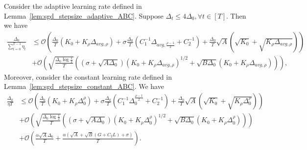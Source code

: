 \documentclass[10pt,a4paper]{amsart}
\newcommand{\Kr}{K_{\rho}}
\newcommand{\paren}[1]{\left( #1 \right)}
\begin{document}
\begin{lemma}\label{lem:sgd_stepsize_complexity_ABC}
    Consider the adaptive learning rate defined in Lemma~\ref{lem:sgd_stepsize_adaptive_ABC}. 
    Suppose $\Delta_t\leq 4\Delta_0,\forall t\in[T]$.
    Then  we have 
    \begin{align*}
        \frac{\Delta_0}{\sum_{t=0}^{T-1}\eta_t}&\leq
        \mathcal{O}\paren{\frac{\Delta_0}{T}\paren{K_0+\Kr\Delta_{avg,\rho}}+\sigma\frac{\Delta_0}{T}\paren{C_1^{-1}\Delta_{avg,\frac{\rho-1}{2}}+C_2^{-1}}
        +\frac{\Delta_0}{T}\sqrt{A}\paren{\sqrt{K_0}+\sqrt{\Kr\Delta_{avg,\rho}}}}\\
        &+\mathcal{O}\paren{\sqrt{\frac{\Delta_0\log\frac{1}{\delta}}{T}}\paren{ \paren{\sigma+\sqrt{A\Delta_0}}\paren{K_0+\Kr\Delta_{avg,\rho}}^{1/2}+\sqrt{B\Delta_0}\paren{K_0+\Kr\Delta_{avg,\rho}}}},
    \end{align*}
    Moreover, consider the constant learning rate defined in Lemma~\ref{lem:sgd_stepsize_constant_ABC}. We have 
    \begin{align*}
        \frac{\Delta_0}{\eta T}&\leq
        \mathcal{O}\paren{\frac{\Delta_0}{T}\paren{K_0+\Kr\Delta_{0}^{\rho}}+\sigma\frac{\Delta_0}{T}\paren{C_1^{-1}\Delta_{0}^{\frac{\rho-1}{2}}+C_2^{-1}}
        +\frac{\Delta_0}{T}\sqrt{A}\paren{\sqrt{K_0}+\sqrt{\Kr\Delta_{0}^{\rho}}}}\\
        &+\mathcal{O}\paren{\sqrt{\frac{\Delta_0\log\frac{1}{\delta}}{T}}\paren{ \paren{\sigma+\sqrt{A\Delta_0}}\paren{K_0+\Kr\Delta_{0}^{\rho}}^{1/2}+\sqrt{B\Delta_0}\paren{K_0+\Kr\Delta_{0}^{\rho}}}}\\
        &+\mathcal{O}\paren{\frac{\alpha\sqrt{A}\Delta_0}{T}+\frac{\alpha\paren{\sqrt{A}+\sqrt{B}(G+C_2L)+\sigma}}{T}}.
    \end{align*}
\end{lemma}
\end{document}
